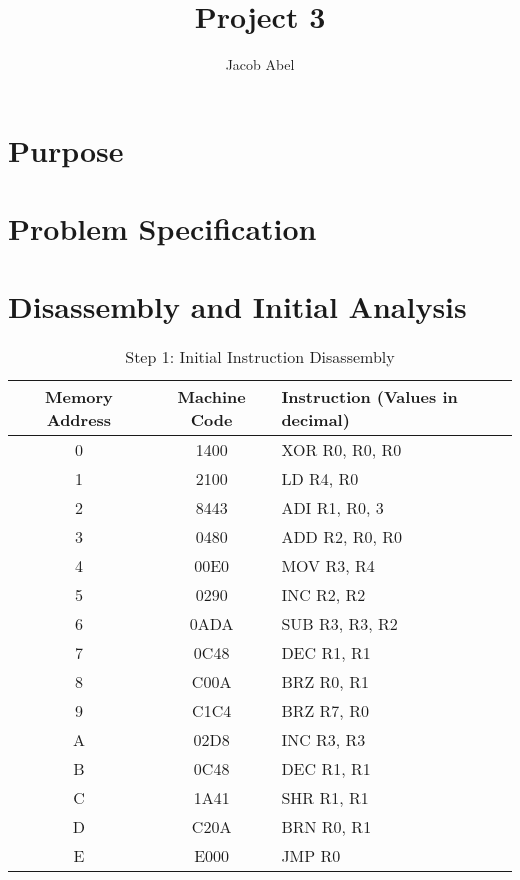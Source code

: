 \documentclass[12pt,letterpaper,titlepage]{article}
\author{Jacob Abel}
\title{Project 3}
\begin{document}
\maketitle


\tableofcontents
\pagebreak
\listoftables

\listoffigures

\pagebreak
\begin{raggedright}

\section{Purpose}


\section{Problem Specification}


\section{Disassembly and Initial Analysis}

\begin{table}[ht]
\centering
\begin{tabular}{|c|c|l|} \hline 
Memory Address & Machine Code & Instruction (Values in decimal) \\ \hline 
0 & 1400 & XOR R0, R0, R0   \\ \hline 
1 & 2100 & LD  R4, R0       \\ \hline 
2 & 8443 & ADI R1, R0, 3   \\ \hline 
3 & 0480 & ADD R2, R0, R0   \\ \hline 
4 & 00E0 & MOV R3, R4       \\ \hline 
5 & 0290 & INC R2, R2       \\ \hline 
6 & 0ADA & SUB R3, R3, R2   \\ \hline 
7 & 0C48 & DEC R1, R1       \\ \hline 
8 & C00A & BRZ R0, R1       \\ \hline 
9 & C1C4 & BRZ R7, R0       \\ \hline 
A & 02D8 & INC R3, R3       \\ \hline 
B & 0C48 & DEC R1, R1       \\ \hline 
C & 1A41 & SHR R1, R1       \\ \hline 
D & C20A & BRN R0, R1       \\ \hline 
E & E000 & JMP R0           \\ \hline 
\end{tabular} 
\caption{Step 1: Initial Instruction Disassembly}\label{step1}
\end{table}


\end{raggedright}
\end{document}
